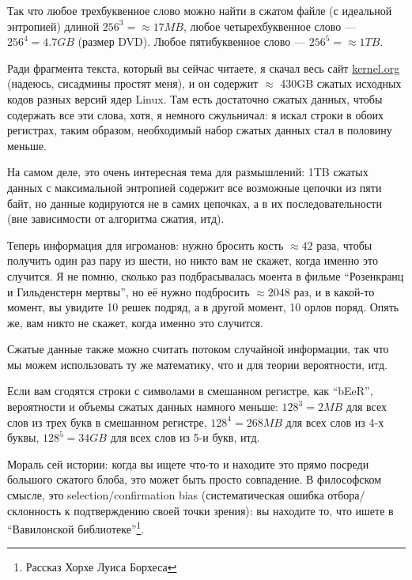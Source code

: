 Так что любое трехбуквенное слово можно найти в сжатом файле (с идеальной энтропией) длиной $256^3 = \approx 17MB$, любое четырехбуквенное слово --- $256^4 = 4.7GB$ (размер DVD).
Любое пятибуквенное слово --- $256^5 = \approx 1TB$.

Ради фрагмента текста, который вы сейчас читаете, я скачал весь сайт \href{https://www.kernel.org/}{kernel.org} (надеюсь, сисадмины простят меня),
и он содержит $\approx$ 430GB сжатых исходных кодов разных версий ядер Linux.
Там есть достаточно сжатых данных, чтобы содержать все эти слова, хотя, я немного сжульничал: я искал строки в обоих регистрах, таким образом, необходимый набор сжатых данных стал в половину меньше.

На самом деле, это очень интересная тема для размышлений: 1TB сжатых данных с максимальной энтропией содержит все возможные цепочки из пяти байт,
но данные кодируются не в самих цепочках, а в их последовательности (вне зависимости от алгоритма сжатия, итд).

Теперь информация для игроманов: нужно бросить кость $\approx 42$ раза, чтобы получить один раз пару из шести, но никто вам не скажет, когда именно это случится.
Я не помню, сколько раз подбрасывалась моента в фильме ``Розенкранц и Гильденстерн мертвы'', но её нужно подбросить $\approx 2048$ раз, и в какой-то момент, вы увидите 10 решек подряд, а в другой момент,
10 орлов поряд.
Опять же, вам никто не скажет, когда именно это случится.

Сжатые данные также можно считать потоком случайной информации, так что мы можем использовать ту же математику, что и для теории вероятности, итд.

Если вам сгодятся строки с символами в смешанном регистре, как ``bEeR'', вероятности и объемы сжатых данных намного меньше:
$128^3=2MB$ для всех слов из трех букв в смешанном регистре,
$128^4=268MB$ для всех слов из 4-х буквы,
$128^5=34GB$ для всех слов из 5-и букв, итд.

Мораль сей истории: когда вы ищете что-то и находите это прямо посреди большого сжатого блоба, это может быть просто совпадение.
В философском смысле, это selection/confirmation bias (систематическая ошибка отбора/склонность к подтверждению своей точки зрения):
вы находите то, что ишете в ``Вавилонской библиотеке''\footnote{Рассказ Хорхе Луиса Борхеса}.

